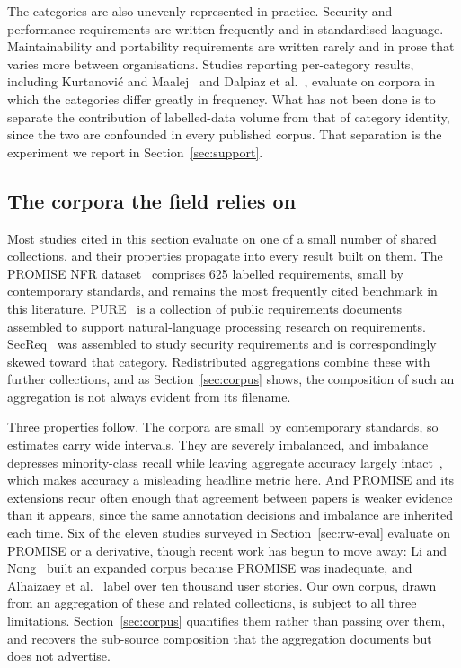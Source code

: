 \documentclass[11pt,a4paper]{article}
\begin{document}
The categories are also unevenly represented in practice. Security and performance
requirements are written frequently and in standardised language. Maintainability and portability requirements are written rarely and in prose that varies more between
organisations. Studies reporting per-category results, including Kurtanović and
Maalej~\cite{kurtanovic2017} and Dalpiaz et al.~\cite{dalpiaz2019}, evaluate on corpora in
which the categories differ greatly in frequency. What has not been done is
to separate the contribution of labelled-data volume from that of category identity, since
the two are confounded in every published corpus. That separation is the experiment we
report in Section~\ref{sec:support}.

\subsection{The corpora the field relies on}
\label{sec:rw-corpora}

Most studies cited in this section evaluate on one of a small number of shared
collections, and their properties propagate into every result built on them. The PROMISE NFR
dataset~\cite{clelandhuang2007} comprises 625 labelled requirements, small by contemporary
standards, and remains the most frequently cited benchmark in this literature. PURE~\cite{ferrari2017} is a collection of public
requirements documents assembled to support natural-language processing research on
requirements. SecReq~\cite{knauss2011} was assembled to study security requirements and is
correspondingly skewed toward that category. Redistributed aggregations combine these with
further collections, and as Section~\ref{sec:corpus} shows, the composition of such an
aggregation is not always evident from its filename.

Three properties follow. The corpora are small by contemporary standards, so estimates carry
wide intervals. They are severely imbalanced, and imbalance depresses minority-class recall
while leaving aggregate accuracy largely intact~\cite{he2009}, which makes accuracy a
misleading headline metric here. And PROMISE and its extensions recur often enough that
agreement between papers is weaker evidence than it appears, since the same annotation
decisions and imbalance are inherited each time. Six of the eleven studies surveyed in Section~\ref{sec:rw-eval} evaluate on PROMISE or a derivative, though recent work has
begun to move away: Li and Nong~\cite{li2022} built an expanded corpus because PROMISE was
inadequate, and Alhaizaey et al.~\cite{alhaizaey2025} label over ten thousand user stories.
Our own corpus, drawn from an aggregation of these and related collections, is subject to all
three limitations. Section~\ref{sec:corpus} quantifies them rather than passing over them, and
recovers the sub-source composition that the aggregation documents but does not advertise.
\end{document}
